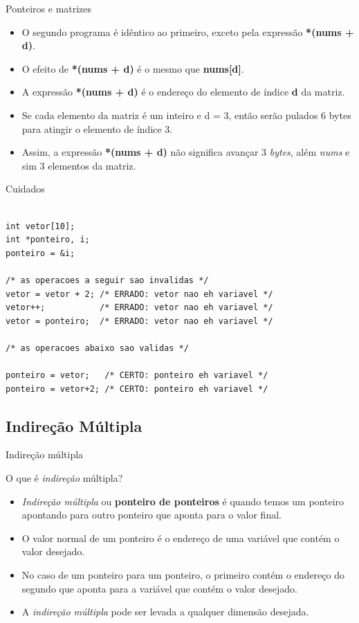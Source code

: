 \begin{frame}{Ponteiros e matrizes}  
  \begin{itemize}[<+->]
    \item O segundo programa é idêntico ao primeiro, exceto pela expressão \textbf{*(nums + d)}.
    \item \alert{O efeito de \textbf{*(nums + d)} é o mesmo que \textbf{nums[d]}}.
    \item A expressão \textbf{*(nums + d)} é o endereço do elemento de índice \textbf{d} da matriz.
    \item Se cada elemento da matriz é um inteiro e d = 3, então serão pulados 6 bytes para atingir o elemento de índice 3.
    \item Assim, a expressão \textbf{*(nums + d)} não significa avançar 3 \textit{bytes}, além \textit{nums} e sim 3 elementos da matriz.
  \end{itemize}
\end{frame}




\begin{frame}{Cuidados}  

\begin{verbatim}

int vetor[10];
int *ponteiro, i;
ponteiro = &i;

/* as operacoes a seguir sao invalidas */
vetor = vetor + 2; /* ERRADO: vetor nao eh variavel */
vetor++;           /* ERRADO: vetor nao eh variavel */
vetor = ponteiro;  /* ERRADO: vetor nao eh variavel */

/* as operacoes abaixo sao validas */

ponteiro = vetor;   /* CERTO: ponteiro eh variavel */
ponteiro = vetor+2; /* CERTO: ponteiro eh variavel */
\end{verbatim}


\end{frame}


\subsection{Indireção Múltipla}
\begin{frame}[c]{Indireção múltipla}
\begin{block}{O que é \textit{indireção} múltipla?}
  \begin{itemize}[<+->]
    \item \textit{Indireção múltipla} ou \textbf{ponteiro de ponteiros} é quando temos um ponteiro apontando para outro ponteiro que aponta para o valor final.
    \item O valor normal de um ponteiro é o endereço de uma variável que contém o valor desejado.
    \item No caso de um ponteiro para um ponteiro, o primeiro contém o endereço do segundo que aponta para a variável que contém o valor desejado.
    \item A \textit{indireção múltipla} pode ser levada a qualquer dimensão desejada. 
  \end{itemize}
\end{block}    
\end{frame}

